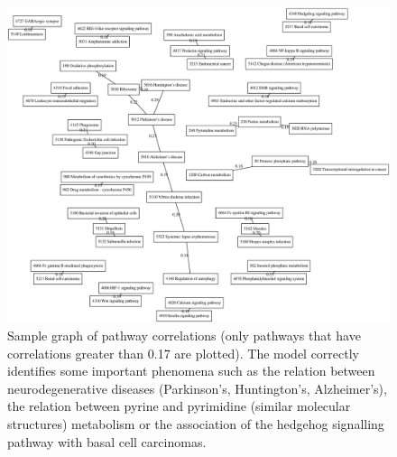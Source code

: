 \documentclass[12pt,a4]{article}
\begin{document}
\begin{figure}[!htb]
\includegraphics[width=\textwidth]{progress-report-pathways.eps}
\caption{Sample graph of pathway correlations (only pathways that have correlations greater than 0.17 are plotted). The model correctly identifies some important phenomena such as the relation between neurodegenerative diseases (Parkinson's, Huntington's, Alzheimer's), the relation between pyrine and pyrimidine (similar molecular structures) metabolism or the association of the hedgehog signalling pathway with basal cell carcinomas.}
\end{figure}
\end{document}
